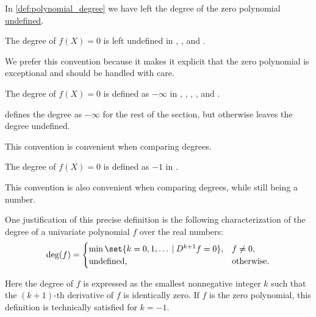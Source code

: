 \begin{remark}\label{rem:zero_polynomial_degree}
  In \cref{def:polynomial_degree} we have left the degree of the zero polynomial \hyperref[con:undefinedness]{undefined}.

  \begin{thmenum}
     The degree of \( f(X) = 0 \) is left undefined in
    \cite[42]{Rotman2015AdvancedModernAlgebraPart1},
    \cite[118]{Тыртышников2017ОсновыАлгебры},
    \cite[132]{Курош1968КурсВысшейАлгебры} and
    \cite[22]{ГеновМиховскиМоллов1991Алгебра}.

    We prefer this convention because it makes it explicit that the zero polynomial is exceptional and should be handled with care.

     The degree of \( f(X) = 0 \) is defined as \( -\infty \) in
    \cite[97]{Lang2002Algebra},
    \cite[128]{Jacobson1985BasicAlgebraI},
    \cite[125]{Aluffi2009Algebra},
    \cite[28]{Ahlfors1979ComplexAnalysis},
    \cite[93]{Винберг2014КурсАлгебры} and
    \cite[183]{Кострикин2000АлгебраЧасть1}.

     defines the degree as \( -\infty \) for the rest of the section, but otherwise leaves the degree undefined.

    This convention is convenient when comparing degrees.

     The degree of \( f(X) = 0 \) is defined as \( -1 \) in
    \cite[10]{FriedbergInselSpence2018LinearAlgebra}.

    This convention is also convenient when comparing degrees, while still being a number.

    One justification of this precise definition is the following characterization of the degree of a univariate polynomial \( f \) over the real numbers:
    \begin{equation*}
      \deg(f) = \begin{cases}
        \min\set{ k = 0, 1, \ldots \given D^{k+1} f = 0 }, &f \neq 0, \\
        \T{undefined},                                     &\T{otherwise.}
      \end{cases}
    \end{equation*}

    Here the degree of \( f \) is expressed as the smallest nonnegative integer \( k \) such that the \( (k + 1) \)-th derivative of \( f \) is identically zero. If \( f \) is the zero polynomial, this definition is technically satisfied for \( k = -1 \).
  \end{thmenum}
\end{remark}

